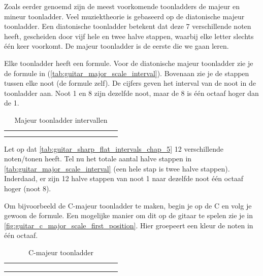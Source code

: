 Zoals eerder genoemd zijn de meest voorkomende toonladders de majeur en mineur toonladder. Veel muziektheorie is gebaseerd op de diatonische majeur toonladder. Een diatonische toonladder betekent dat deze 7 verschillende noten heeft, gescheiden door vijf hele en twee halve stappen, waarbij elke letter slechts één keer voorkomt. De majeur toonladder is de eerste die we gaan leren.

Elke toonladder heeft een formule. Voor de diatonische majeur toonladder zie je de formule in (\autoref{tab:guitar_major_scale_interval}). Bovenaan zie je de stappen tussen elke noot (de formule zelf). De cijfers geven het interval van de noot in de toonladder aan. Noot 1 en 8 zijn dezelfde noot, maar de 8 is één octaaf hoger dan de 1.

\begin{table}[h]
	\centering
	\begin{NiceTabular}{*{16}{P{0.05mm}}}
		\Block{}{} &  & &  & &  & &  & &  & &  & &  & & \Block{}{} \\
		 & &  & &  & &  & &  & &  & &  & &  &
	\end{NiceTabular}
	\caption{Majeur toonladder intervallen}
	\label{tab:guitar_major_scale_interval}
\end{table}

Let op dat \autoref{tab:guitar_sharp_flat_intervals_chap_5} 12 verschillende noten/tonen heeft. Tel nu het totale aantal halve stappen in \autoref{tab:guitar_major_scale_interval} (een hele stap is twee halve stappen). Inderdaad, er zijn 12 halve stappen van noot 1 naar dezelfde noot één octaaf hoger (noot 8).

Om bijvoorbeeld de C-majeur toonladder te maken, begin je op de C en volg je gewoon de formule. Een mogelijke manier om dit op de gitaar te spelen zie je in \autoref{fig:guitar_c_major_scale_first_position}. Hier groepeert een kleur de noten in één octaaf.

\begin{table}[h]
	\centering
	\begin{NiceTabular}{*{16}{P{0.05mm}}}
		\Block{}{} &  & &  & &  & &  & &  & &  & &  & & \Block{}{} \\
		 & &  & &  & &  & &  & &  & &  & &  & \\
		 & &  & &  & &  & &  & &  & &  & &  & 
	\end{NiceTabular}
	\caption{C-majeur toonladder}
	\label{tab:guitar_c_major_scale}
\end{table}

